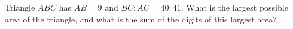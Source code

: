 Triangle $ABC$ has $AB=9$ and $BC:AC=40:41$. What is the largest possible area of the triangle, and what is the sum of the digits of this largest area?
